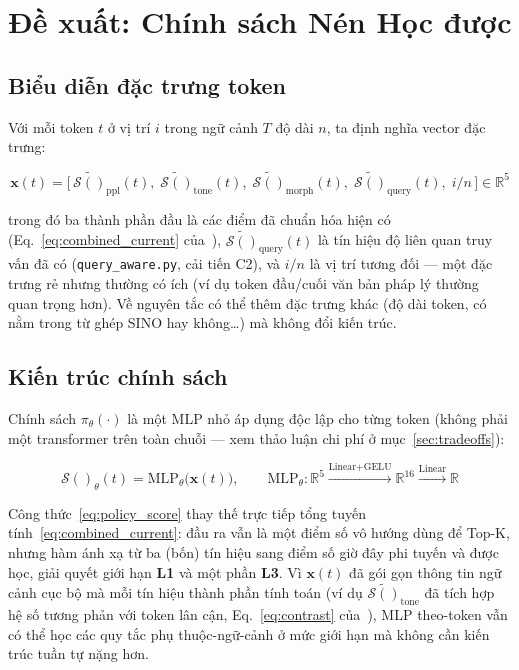 \documentclass[12pt,a4paper]{article}
\newcommand{\score}[1]{\mathcal{S}(#1)}      %
\newcommand{\pol}[1]{\pi_{\theta}(#1)}       %
\begin{document}
\section{Đề xuất: Chính sách Nén Học được}

\subsection{Biểu diễn đặc trưng token}

Với mỗi token $t$ ở vị trí $i$ trong ngữ cảnh $T$ độ dài $n$, ta định nghĩa vector đặc trưng:

\begin{equation}\label{eq:features}
    \mathbf{x}(t) = \Big[\, \tilde{\score{}}_{\text{ppl}}(t),\; \tilde{\score{}}_{\text{tone}}(t),\; \tilde{\score{}}_{\text{morph}}(t),\; \tilde{\score{}}_{\text{query}}(t),\; i/n \,\Big] \in \mathbb{R}^5
\end{equation}

trong đó ba thành phần đầu là các điểm đã chuẩn hóa hiện có (Eq.~\ref{eq:combined_current} của~\cite{lacc2026}), $\tilde{\score{}}_{\text{query}}(t)$ là tín hiệu độ liên quan truy vấn đã có (\texttt{query\_aware.py}, cải tiến C2), và $i/n$ là vị trí tương đối --- một đặc trưng rẻ nhưng thường có ích (ví dụ token đầu/cuối văn bản pháp lý thường quan trọng hơn). Về nguyên tắc có thể thêm đặc trưng khác (độ dài token, có nằm trong từ ghép SINO hay không\ldots) mà không đổi kiến trúc.

\subsection{Kiến trúc chính sách}

Chính sách $\pol{\cdot}$ là một MLP nhỏ áp dụng độc lập cho từng token (không phải một transformer trên toàn chuỗi --- xem thảo luận chi phí ở mục~\ref{sec:tradeoffs}):

\begin{equation}\label{eq:policy_score}
    \score{}_{\theta}(t) = \text{MLP}_\theta\big(\mathbf{x}(t)\big), \qquad \text{MLP}_\theta: \mathbb{R}^5 \xrightarrow{\text{Linear+GELU}} \mathbb{R}^{16} \xrightarrow{\text{Linear}} \mathbb{R}
\end{equation}

Công thức~\eqref{eq:policy_score} thay thế trực tiếp tổng tuyến tính~\eqref{eq:combined_current}: đầu ra vẫn là một điểm số vô hướng dùng để Top-K, nhưng hàm ánh xạ từ ba (bốn) tín hiệu sang điểm số giờ đây phi tuyến và được học, giải quyết giới hạn \textbf{L1} và một phần \textbf{L3}. Vì $\mathbf{x}(t)$ đã gói gọn thông tin ngữ cảnh cục bộ mà mỗi tín hiệu thành phần tính toán (ví dụ $\tilde{\score{}}_{\text{tone}}$ đã tích hợp hệ số tương phản với token lân cận, Eq.~\ref{eq:contrast} của~\cite{lacc2026}), MLP theo-token vẫn có thể học các quy tắc phụ thuộc-ngữ-cảnh ở mức giới hạn mà không cần kiến trúc tuần tự nặng hơn.
\end{document}
